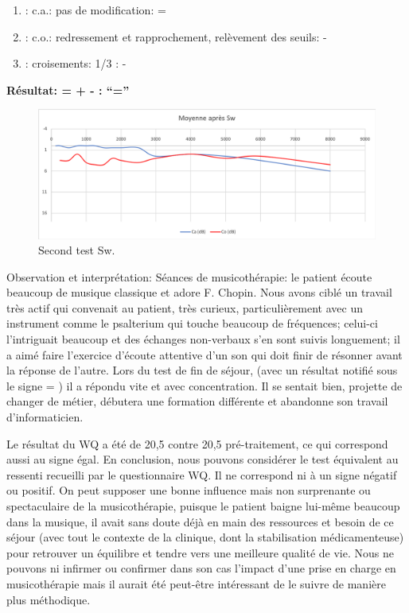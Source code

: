 	\begin{enumerate}

 		\item : c.a.: pas de modification: = %

 		\item : c.o.: redressement et rapprochement,
                  relèvement des seuils: -       %
 		\item : croisements: 1/3 :  -

                \end{enumerate}

                \textbf{ Résultat:  = +  -        : ``=''}

                \begin{figure}[th]
\centering
\includegraphics[width=1\linewidth]{images/graphiques/sw_post.png}
\caption[Patient Sw.: 2° test]{Second test Sw.}

\end{figure}

 Observation et interprétation:  Séances de musicothérapie: 
 le patient écoute beaucoup de musique classique et adore F. Chopin.
 Nous avons ciblé un travail très actif qui convenait au patient, très curieux, particulièrement avec un 
 instrument comme le psalterium qui touche beaucoup de fréquences; celui-ci l'intriguait beaucoup et 
 des échanges non-verbaux s'en sont suivis longuement; il a aimé faire  l'exercice d'écoute attentive 
 d'un 
 son qui doit finir de résonner avant la réponse de l'autre. 
Lors du test de fin de séjour, (avec un résultat notifié sous le signe = ) il a répondu vite et avec 
concentration. Il se sentait bien, 
projette de changer de métier, débutera une formation différente et abandonne  son travail 
d'informaticien.


Le résultat du WQ a été de 20,5 contre 20,5 pré-traitement, ce qui
correspond aussi au signe égal.
En conclusion, nous pouvons considérer le test équivalent au ressenti recueilli par le questionnaire WQ. 
Il ne correspond ni à un signe négatif ou positif. On peut supposer une bonne influence mais non 
surprenante ou spectaculaire de la musicothérapie, puisque le patient baigne lui-même beaucoup dans 
la musique, il avait sans doute déjà en main des ressources et  
besoin de ce séjour (avec tout le contexte de la clinique, dont la stabilisation médicamenteuse) pour 
retrouver un équilibre et tendre vers une meilleure qualité de vie. 
Nous ne pouvons ni infirmer ou confirmer dans son cas l'impact d'une prise en charge en  
musicothérapie mais il aurait été  peut-être 
intéressant de le suivre de manière plus méthodique. 

